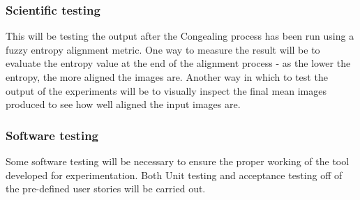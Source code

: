 \subsubsection{Scientific testing}

This will be testing the output after the \Gls{Congealing} process has been run using a fuzzy entropy alignment metric. One way to measure the result will be to evaluate the entropy value at the end of the alignment process - as the lower the entropy, the more aligned the images are. Another way in which to test the output of the experiments will be to visually inspect the final mean images produced to see how well aligned the input images are.

\subsubsection{Software testing}

Some software testing will be necessary to ensure the proper working of the tool developed for experimentation. Both Unit testing and acceptance testing off of the pre-defined user stories will be carried out.
